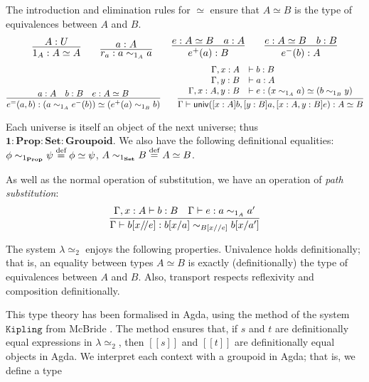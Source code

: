 \documentclass{easychair}
\newcommand{\Prop}{\ensuremath{\mathbf{Prop}}}
\newcommand{\Set}{\ensuremath{\mathbf{Set}}}
\newcommand{\Groupoid}{\ensuremath{\mathbf{Groupoid}}}
\newcommand{\LEtwo}{\ensuremath{\lambda \! \! \simeq_2}}
\newcommand{\eqdef}{\mathrel{\smash{\stackrel{\text{def}}{=}}}}
\newcommand{\brackets}[1]{\ensuremath{[ \! [ {#1} ] \! ]}}
\begin{document}
The introduction and elimination rules for $\simeq$ ensure that $A \simeq B$ is the type of equivalences between $A$ and $B$.
\[ \infer{1_A : A \simeq A}{A : U} \qquad \infer{r_a : a \sim_{1_A} a}{a : A} \qquad \infer{e^+(a) : B}{e : A \simeq B \quad a : A} \qquad \infer{e^-(b) : A}{e : A \simeq B \quad b : B} \]
\[ \infer{e^=(a,b) : (a \sim_{1_A} e^-(b)) \simeq (e^+(a) \sim_{1_B} b)}{a : A \quad b : B \quad e : A \simeq B} \qquad
\infer{\Gamma \vdash \mathsf{univ}([x : A] b, [y : B] a, [x : A, y : B]e) : A \simeq B}{\begin{array}{rl}
\Gamma, x : A & \vdash b : B \\
\Gamma, y : B & \vdash a : A \\
\Gamma, x : A, y : B & \vdash e : (x \sim_{1_A} a) \simeq (b \sim_{1_B} y)
\end{array}} \]

Each universe is itself an object of the next universe; thus $\mathbf{1} : \Prop : \Set : \Groupoid$.  We also have the following definitional equalities:
$\phi \sim_{1_\Prop} \psi \eqdef \phi \simeq \psi$, 
$A \sim_{1_\Set} B \eqdef A \simeq B$.

As well as the normal operation of substitution, we have an operation of \emph{path substitution}:
\[ \infer{\Gamma \vdash b [x / \! / e] : b [x/a] \sim_{B[x//e]} b[x/a']}{\Gamma, x : A \vdash b : B \quad \Gamma \vdash e : a \sim_{1_A} a'} \]

The system $\LEtwo$ enjoys the following properties.  Univalence holds definitionally; that is, an equality between types $A \simeq B$ is exactly (definitionally) the type of equivalences between $A$ and $B$.  Also, transport respects reflexivity and composition definitionally.

This type theory has been formalised in Agda, using the method of the system $\mathtt{Kipling}$ from McBride \cite{McBridea}.  The method ensures that, if $s$ and $t$ are definitionally equal expressions in $\lambda \simeq_2$, then $\brackets{s}$ and $\brackets{t}$ are definitionally equal objects in Agda.  We interpret each context with a groupoid in Agda; that is, we define
a type

\end{document}
